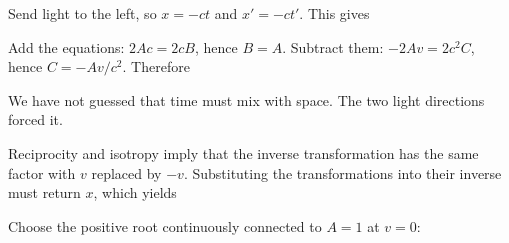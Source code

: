\documentclass[
  11pt,
  letterpaper,
  oneside,
  openany]{scrbook}
\begin{document}
\begin{center}
\begingroup
{}
\ifdim\wd\grmathbox>\linewidth
\resizebox{\linewidth}{!}{\usebox{\grmathbox}}
\else\usebox{\grmathbox}\fi
\endgroup
\end{center}

Send light to the left, so \(x=-ct\) and \(x'=-ct'\). This gives

\begin{center}
\begingroup
{}
\ifdim\wd\grmathbox>\linewidth
\resizebox{\linewidth}{!}{\usebox{\grmathbox}}
\else\usebox{\grmathbox}\fi
\endgroup
\end{center}

Add the equations: \(2Ac=2cB\), hence \(B=A\). Subtract them:
\(-2Av=2c^2C\), hence \(C=-Av/c^2\). Therefore

\begin{center}
\begingroup
{}
\ifdim\wd\grmathbox>\linewidth
\resizebox{\linewidth}{!}{\usebox{\grmathbox}}
\else\usebox{\grmathbox}\fi
\endgroup
\end{center}

We have not guessed that time must mix with space. The two light
directions forced it.

Reciprocity and isotropy imply that the inverse transformation has the
same factor with \(v\) replaced by \(-v\). Substituting the
transformations into their inverse must return \(x\), which yields

\begin{center}
\begingroup
{}
\ifdim\wd\grmathbox>\linewidth
\resizebox{\linewidth}{!}{\usebox{\grmathbox}}
\else\usebox{\grmathbox}\fi
\endgroup
\end{center}

Choose the positive root continuously connected to \(A=1\) at \(v=0\):

\begin{center}
\begingroup
{}
\ifdim\wd\grmathbox>\linewidth
\resizebox{\linewidth}{!}{\usebox{\grmathbox}}
\else\usebox{\grmathbox}\fi
\endgroup
\end{center}
\end{document}
